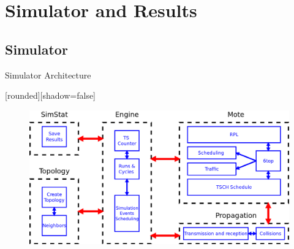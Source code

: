 \section{Simulator and Results}
\subsection{Simulator}
\begin{withoutheadline}
\begin{frame}{Simulator Architecture}


[rounded][shadow=false]

\begin{figure}[p]

\includegraphics[width=\linewidth]{figures/SIM.png}

\end{figure}



\end{frame}
\end{withoutheadline}

